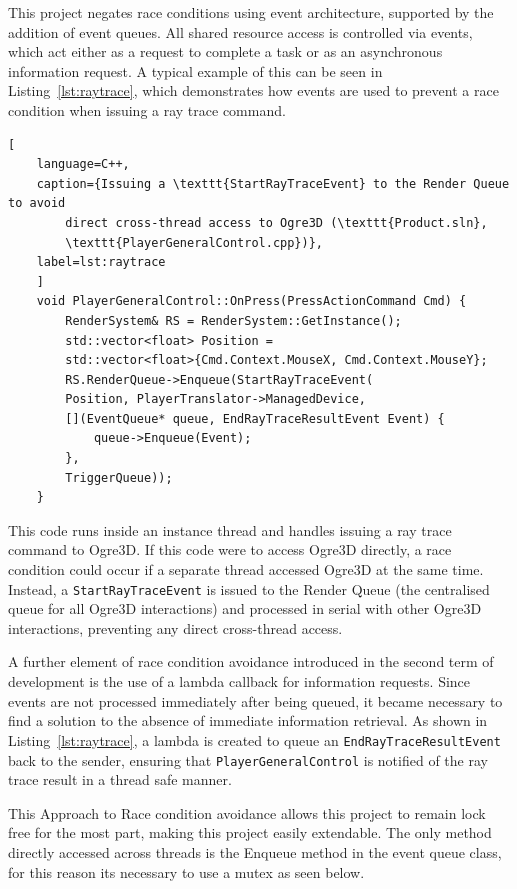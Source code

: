\documentclass[]{final_report}
\begin{document}
This project negates race conditions using event architecture, supported by the 
addition of event queues. All shared resource access is controlled via events, 
which act either as a request to complete a task or as an asynchronous 
information request. A typical example of this can be seen in 
Listing~\ref{lst:raytrace}, which demonstrates how events are used to prevent 
a race condition when issuing a ray trace command.

\begin{lstlisting}[
	language=C++,
	caption={Issuing a \texttt{StartRayTraceEvent} to the Render Queue to avoid 
		direct cross-thread access to Ogre3D (\texttt{Product.sln}, 
		\texttt{PlayerGeneralControl.cpp})},
	label=lst:raytrace
	]
	void PlayerGeneralControl::OnPress(PressActionCommand Cmd) {
		RenderSystem& RS = RenderSystem::GetInstance();
		std::vector<float> Position =
		std::vector<float>{Cmd.Context.MouseX, Cmd.Context.MouseY};
		RS.RenderQueue->Enqueue(StartRayTraceEvent(
		Position, PlayerTranslator->ManagedDevice,
		[](EventQueue* queue, EndRayTraceResultEvent Event) {
			queue->Enqueue(Event);
		},
		TriggerQueue));
	}
\end{lstlisting}

This code runs inside an instance thread and handles issuing a ray trace command 
to Ogre3D. If this code were to access Ogre3D directly, a race condition could 
occur if a separate thread accessed Ogre3D at the same time. Instead, a 
\texttt{StartRayTraceEvent} is issued to the Render Queue (the centralised queue 
for all Ogre3D interactions) and processed in serial with other Ogre3D 
interactions, preventing any direct cross-thread access.

A further element of race condition avoidance introduced in the second term of 
development is the use of a lambda callback for information requests. Since 
events are not processed immediately after being queued, it became necessary to 
find a solution to the absence of immediate information retrieval. As shown in 
Listing~\ref{lst:raytrace}, a lambda is created to queue an 
\texttt{EndRayTraceResultEvent} back to the sender, ensuring that 
\texttt{PlayerGeneralControl} is notified of the ray trace result in a thread 
safe manner.

This Approach to Race condition avoidance allows this project to remain lock free for the most part, making this project easily extendable. The only method directly accessed across threads is the Enqueue method in the event queue class, for this reason its necessary to use a mutex as seen below.
\end{document}
